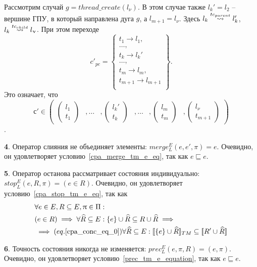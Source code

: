 Рассмотрим случай $g = thread\_create(l_\nu)$. В этом случае также $l_k' = l_2$ -- вершине ГПУ, в который направлена дуга $g$, а $l_{m+1} = l_\nu$. Здесь $l_k \stackrel{tc_{parent}}{\leadsto} l_k'$, $l_k \stackrel{tc_{child}}{\leadsto} l_\upnu$. При этом переходе $$ c'_{pc} = 
\left\lbrace
\begin{array}{c}
t_1 \to l_1,\\
\dots,\\
t_k \to l_k'\\
\dots,\\
t_m \to l_m,\\
t_{m+1} \to l_{m+1}\\
\end{array}
\right\rbrace.$$ Это означает, что $$ с' \in \begin{pmatrix}
\begin{pmatrix}
l_1 \\
t_1 
\end{pmatrix}& ,
\dots& ,
\begin{pmatrix}
l_k' \\
t_k 
\end{pmatrix}& ,
\dots& ,
\begin{pmatrix}
l_m \\
t_m 
\end{pmatrix}& ,
\begin{pmatrix}
l_\nu \\
t_{m+1} 
\end{pmatrix}
\end{pmatrix}$$.


{\textbf 4.} Оператор слияния не объединяет элементы: $merge^E_L(e, e', \pi) = e$. Очевидно, он удовлетворяет условию~\ref{cpa_merge_tm_e_eq}, так как $e \sqsubseteq e$.

{\textbf 5.} Оператор останова рассматривает состояния индивидуально: $stop^E_L(e, R, \pi) = (e \in R)$. Очевидно, он удовлетворяет условию~\ref{cpa_stop_tm_e_eq}, так как
\begin{align}
&\forall e \in E, R \subseteq E, \uppi \in \Pi: \nonumber \\
& (e \in R) \implies \forall \widehat{R} \subseteq E: \{e\} \cup \widehat{R} \subseteq R \cup \widehat{R} \implies \nonumber \\
& \implies (eq.\ref{cpa_conc_eq_0}) \forall \widehat{R} \subseteq E: [\![ \{e\}\cup \widehat{R} ]\!]_{TM} \subseteq [\![ R' \cup \widehat{R} ]\!]
\end{align}

{\textbf 6.} Точность состояния никогда не изменяется: $prec^E_L(e, \pi, R) = (e, \pi)$.
Очевидно, он удовлетворяет условию~\ref{prec_tm_e_equation}, так как $e \sqsubseteq e$.

